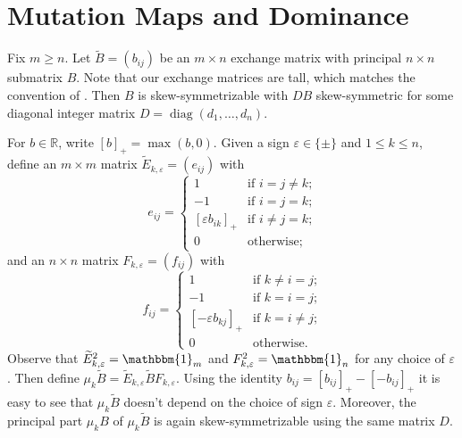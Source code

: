\documentclass{amsart}
\numberwithin{theorem}{section}
\newcommand{\bfb}{\boldsymbol{b}}
\newcommand{\RR}{\mathbb{R}}
\newcommand{\bOne}{\mathbbm{1}}
\newcommand{\diag}{\operatorname{diag}}
\begin{document}
  \section{Mutation Maps and Dominance}
  Fix $m\ge n$.
  Let $\widetilde B=(b_{ij})$ be an $m\times n$ exchange matrix with principal $n\times n$ submatrix $B$.
  Note that our exchange matrices are tall, which matches the convention of \cite{qin}.
  Then $B$ is skew-symmetrizable with $DB$ skew-symmetric for some diagonal integer matrix $D=\diag(d_1,\ldots,d_n)$.
 
  For $b\in\RR$, write $[b]_+=\max(b,0)$.
  Given a sign $\varepsilon\in\{\pm\}$ and $1\le k\le n$, define an $m\times m$ matrix $\widetilde E_{k,\varepsilon}=(e_{ij})$ with
  \begin{equation}
    \label{eq:left mutation matrix}
    e_{ij}=\begin{cases} 1 & \text{if $i=j\ne k$;}\\ -1 & \text{if $i=j=k$;}\\ [\varepsilon b_{ik}]_+ & \text{if $i\ne j=k$;}\\ 0 & \text{otherwise;} \end{cases}
  \end{equation}
  and an $n\times n$ matrix $F_{k,\varepsilon}=(f_{ij})$ with
  \begin{equation}
    \label{eq:right mutation matrix}
    f_{ij}=\begin{cases} 1 & \text{if $k\ne i=j$;}\\ -1 & \text{if $k=i=j$;}\\ [-\varepsilon b_{kj}]_+ & \text{if $k=i\ne j$;}\\ 0 & \text{otherwise.} \end{cases}
  \end{equation}
  Observe that $\widetilde E^2_{k,\varepsilon}=\bOne_m$ and $F^2_{k,\varepsilon}=\bOne_n$ for any choice of $\varepsilon$.
  Then define $\mu_k\widetilde B=\widetilde E_{k,\varepsilon} \widetilde B F_{k,\varepsilon}$.
  Using the identity $b_{ij}=[b_{ij}]_+-[-b_{ij}]_+$ it is easy to see that $\mu_k\widetilde B$ doesn't depend on the choice of sign $\varepsilon$.
  Moreover, the principal part $\mu_k B$ of $\mu_k\widetilde B$ is again skew-symmetrizable using the same matrix $D$.
\end{document}
